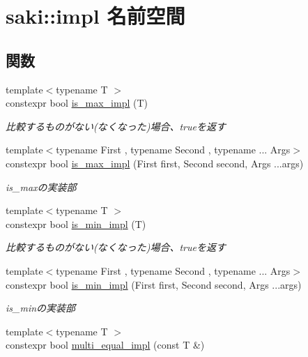\hypertarget{namespacesaki_1_1impl}{}\section{saki\+:\+:impl 名前空間}
\label{namespacesaki_1_1impl}
\subsection*{関数}
\begin{DoxyCompactItemize}
\item 
{\footnotesize template$<$typename T $>$ }\\constexpr bool \mbox{\hyperlink{namespacesaki_1_1impl_a43f254e0ea1de8b5cdfef3e108eff117}{is\+\_\+max\+\_\+impl}} (T)
\begin{DoxyCompactList}\small\item\em 比較するものがない(なくなった)場合、trueを返す \end{DoxyCompactList}\item 
{\footnotesize template$<$typename First , typename Second , typename ... Args$>$ }\\constexpr bool \mbox{\hyperlink{namespacesaki_1_1impl_a3987211cbe7532fd94555a26554acba2}{is\+\_\+max\+\_\+impl}} (First first, Second second, Args ...args)
\begin{DoxyCompactList}\small\item\em is\+\_\+maxの実装部 \end{DoxyCompactList}\item 
{\footnotesize template$<$typename T $>$ }\\constexpr bool \mbox{\hyperlink{namespacesaki_1_1impl_ae9830acbba1cfee8006bd7c0c59cd6df}{is\+\_\+min\+\_\+impl}} (T)
\begin{DoxyCompactList}\small\item\em 比較するものがない(なくなった)場合、trueを返す \end{DoxyCompactList}\item 
{\footnotesize template$<$typename First , typename Second , typename ... Args$>$ }\\constexpr bool \mbox{\hyperlink{namespacesaki_1_1impl_a48cbdb55a841933db26e4857720738bb}{is\+\_\+min\+\_\+impl}} (First first, Second second, Args ...args)
\begin{DoxyCompactList}\small\item\em is\+\_\+minの実装部 \end{DoxyCompactList}\item 
{\footnotesize template$<$typename T $>$ }\\constexpr bool \mbox{\hyperlink{namespacesaki_1_1impl_ac271639854025a923addee4879780f96}{multi\+\_\+equal\+\_\+impl}} (const T \&)

\end{DoxyCompactItemize}
